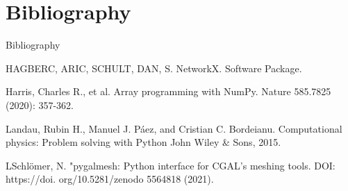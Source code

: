 \documentclass{beamer}
\begin{document}

\section*{Bibliography}
\begin{frame}[allowframebreaks]{Bibliography}

\beamertemplatebookbibitems
\begin{thebibliography}{}
HAGBERC, ARIC, SCHULT, DAN, S. \newblock \textquotedbl NetworkX.\textquotedbl{} \newblock Software Package.

\bibitem{-}Harris, Charles R., et al. \newblock \textquotedbl Array programming with NumPy.\textquotedbl{} \newblock Nature 585.7825 (2020): 357-362.

\bibitem{--}Landau, Rubin H., Manuel J. Páez, and Cristian C. Bordeianu. \newblock \textquotedbl Computational physics: Problem solving with Python\textquotedbl{} \newblock John Wiley & Sons, 2015.

\bibitem{---}LSchlömer, N. \newblock \textquotedbl "pygalmesh: Python interface for CGAL’s meshing tools.\textquotedbl{} \newblock DOI: https://doi. org/10.5281/zenodo 5564818 (2021).

\end{thebibliography}
\end{frame}
\end{document}
